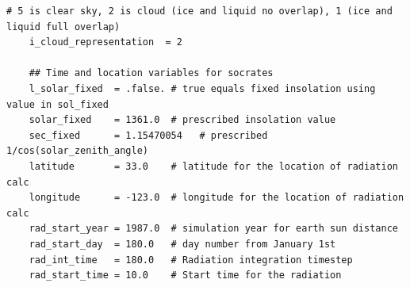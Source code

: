 \documentclass[a4paper,11pt]{article}
\begin{document}
\begin{lstlisting}[caption={Example configuration for radiation control and
    and initialisation. Taken from testcases/stratus/fire\_sc\_diurnal.mcf}]
    # 5 is clear sky, 2 is cloud (ice and liquid no overlap), 1 (ice and liquid full overlap)
    i_cloud_representation  = 2

    ## Time and location variables for socrates
    l_solar_fixed  = .false. # true equals fixed insolation using value in sol_fixed
    solar_fixed    = 1361.0  # prescribed insolation value
    sec_fixed      = 1.15470054   # prescribed 1/cos(solar_zenith_angle)
    latitude       = 33.0    # latitude for the location of radiation calc
    longitude      = -123.0  # longitude for the location of radiation calc
    rad_start_year = 1987.0  # simulation year for earth sun distance
    rad_start_day  = 180.0   # day number from January 1st
    rad_int_time   = 180.0   # Radiation integration timestep
    rad_start_time = 10.0    # Start time for the radiation
\end{lstlisting}
\end{document}
